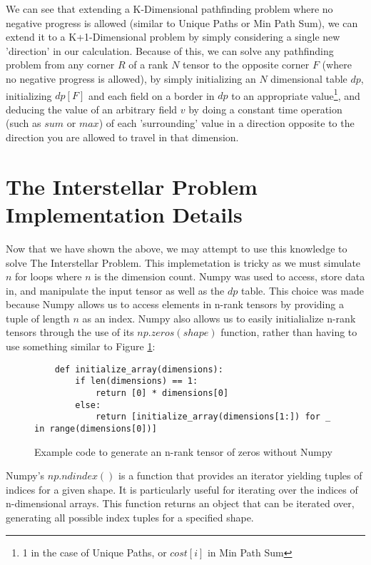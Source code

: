 We can see that extending a K-Dimensional pathfinding problem where no negative progress is allowed (similar to Unique Paths or Min Path Sum),
we can extend it to a K+1-Dimensional problem by simply considering a single new 'direction' in our calculation.
Because of this, we can solve any pathfinding problem from any corner $R$ of a rank $N$ tensor to the opposite corner $F$ (where no negative progress is allowed),
by simply initializing an $N$ dimensional table $dp$, initializing $dp[F]$ and each field on a border in $dp$ to an appropriate value\footnote{1 in the case of Unique Paths, or $cost[i]$ in Min Path Sum}, and deducing the value of an arbitrary field $v$ by doing a constant time operation (such as $sum$ or $max$) of each 'surrounding' value in a direction opposite to the direction you are allowed to travel in that dimension.


\section{The Interstellar Problem Implementation Details}
Now that we have shown the above, we may attempt to use this knowledge to solve The Interstellar Problem.
This implemetation is tricky as we must simulate $n$ for loops where $n$ is the dimension count.
Numpy was used to access, store data in, and manipulate the input tensor as well as the $dp$ table.
This choice was made because Numpy allows us to access elements in n-rank tensors by providing a tuple of length $n$ as an index.
Numpy also allows us to easily initialialize n-rank tensors through the use of its $np.zeros(shape)$ function, rather than having to use something similar to Figure \ref{fig:zeros}:

\begin{figure}[H]
    \centering
    \begin{lstlisting}
    def initialize_array(dimensions):
        if len(dimensions) == 1:
            return [0] * dimensions[0]
        else:
            return [initialize_array(dimensions[1:]) for _ in range(dimensions[0])]
    \end{lstlisting}
    \caption{Example code to generate an n-rank tensor of zeros without Numpy}
    \label{fig:zeros}
\end{figure}

Numpy's $np.ndindex()$ is a function that provides an iterator yielding tuples of indices for a given shape.
It is particularly useful for iterating over the indices of n-dimensional arrays.
This function returns an object that can be iterated over, generating all possible index tuples for a specified shape.

